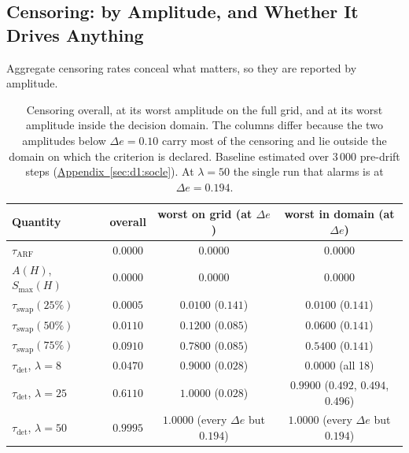 \documentclass[10pt,conference]{IEEEtran}
\theoremstyle{definition}
\begin{document}
\subsection{Censoring: by Amplitude, and Whether It Drives Anything}
\label{sec:d3:censure}

Aggregate censoring rates conceal what matters, so they are reported by amplitude.

\begin{table}[t]
  \centering
\caption{Censoring overall, at its worst amplitude on the full grid, and at its worst
  amplitude inside the decision domain. The columns differ because the two amplitudes below
  $\Delta e = 0.10$ carry most of the censoring and lie outside the domain on which the
  criterion is declared. Baseline estimated over $3\,000$ pre-drift steps
  (\hyperref[sec:d1:socle]{Appendix~\ref*{sec:d1:socle}}). At $\lambda = 50$ the single run that alarms is at
  $\Delta e = 0.194$.}
\label{tab:censure}
  \begin{tabular}{lccc}
    \toprule
    Quantity & overall & worst on grid (at $\Delta e$) & worst in domain (at $\Delta e$) \\
    \midrule
    $\tau_{\mathrm{ARF}}$        & $0.0000$ & $0.0000$ & $0.0000$ \\
    $A(H)$, $S_{\max}(H)$        & $0.0000$ & $0.0000$ & $0.0000$ \\
    $\tau_{\mathrm{swap}}(25\%)$ & $0.0005$ & $0.0100$ ($0.141$) & $0.0100$ ($0.141$) \\
    $\tau_{\mathrm{swap}}(50\%)$ & $0.0110$ & $0.1200$ ($0.085$) & $0.0600$ ($0.141$) \\
    $\tau_{\mathrm{swap}}(75\%)$ & $0.0910$ & $0.7800$ ($0.085$) & $0.5400$ ($0.141$) \\
    $\tau_{\mathrm{det}}$, $\lambda = 8$  & $0.0470$ & $0.9000$ ($0.028$) & $0.0000$ (all 18) \\
    $\tau_{\mathrm{det}}$, $\lambda = 25$ & $0.6110$ & $1.0000$ ($0.028$) & $0.9900$ ($0.492$, $0.494$, $0.496$) \\
    $\tau_{\mathrm{det}}$, $\lambda = 50$ & $0.9995$ & $1.0000$ (every $\Delta e$ but $0.194$) & $1.0000$ (every $\Delta e$ but $0.194$) \\
    \bottomrule
  \end{tabular}

\end{table}
\end{document}
